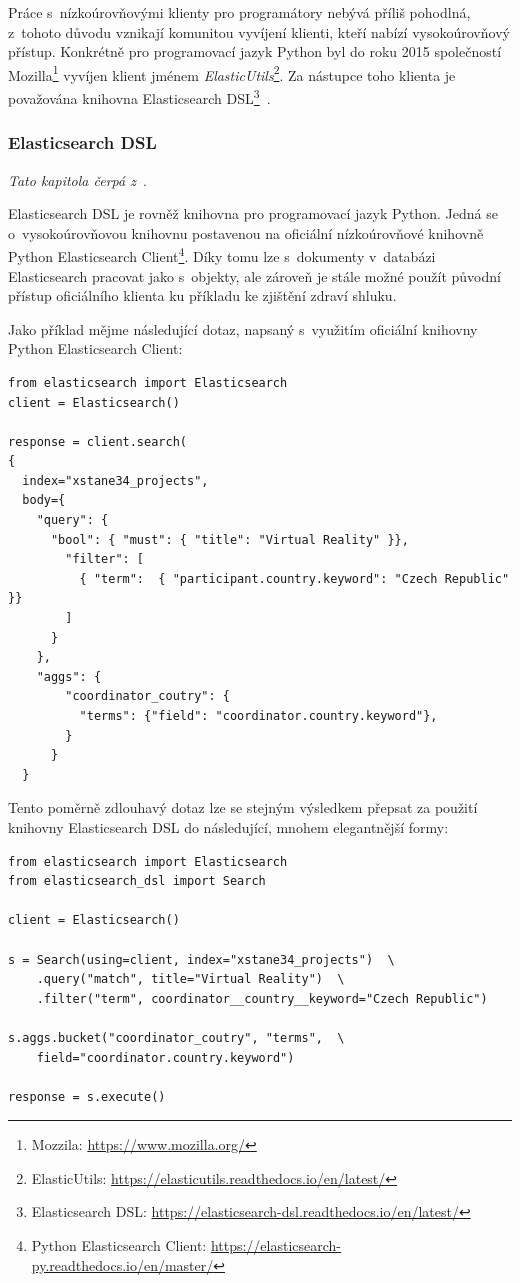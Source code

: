 Práce s~nízkoúrovňovými klienty pro programátory nebývá příliš pohodlná, z~tohoto důvodu vznikají komunitou vyvíjení klienti, kteří nabízí vysokoúrovňový přístup. Konkrétně pro programovací jazyk Python byl do roku 2015 společností Mozilla\footnote{Mozzila: \url{https://www.mozilla.org/}} vyvíjen klient jménem \emph{ElasticUtils}\footnote{ElasticUtils: \url{https://elasticutils.readthedocs.io/en/latest/}}. Za nástupce toho klienta je považována knihovna Elasticsearch DSL\footnote{Elasticsearch DSL: \url{https://elasticsearch-dsl.readthedocs.io/en/latest/}}~\cite{bib:elastic-utils}.

\subsubsection*{Elasticsearch DSL}
\emph{Tato kapitola čerpá z~\cite{bib:elastic-dsl}}.

Elasticsearch DSL je rovněž knihovna pro programovací jazyk Python. Jedná se o~vysokoúrovňovou knihovnu postavenou na oficiální nízkoúrovňové knihovně Python Elasticsearch Client\footnote{Python Elasticsearch Client: \url{https://elasticsearch-py.readthedocs.io/en/master/}}. Díky tomu lze s~dokumenty v~databázi Elasticsearch pracovat jako s~objekty, ale zároveň je stále možné použít původní přístup oficiálního klienta ku příkladu ke zjištění zdraví shluku.

Jako příklad mějme následující dotaz, napsaný s~využitím oficiální knihovny Python Elasticsearch Client:
\begin{verbatim}
from elasticsearch import Elasticsearch
client = Elasticsearch()

response = client.search(
{
  index="xstane34_projects",
  body={
    "query": { 
      "bool": { "must": { "title": "Virtual Reality" }}, 
        "filter": [ 
          { "term":  { "participant.country.keyword": "Czech Republic" }}
        ]
      }
    },
    "aggs": {
        "coordinator_coutry": {
          "terms": {"field": "coordinator.country.keyword"},
        }
      }
  }
\end{verbatim}

Tento poměrně zdlouhavý dotaz lze se stejným výsledkem přepsat za použití knihovny Elasticsearch DSL do následující, mnohem elegantnější formy:

\begin{verbatim}
from elasticsearch import Elasticsearch
from elasticsearch_dsl import Search

client = Elasticsearch()

s = Search(using=client, index="xstane34_projects")  \
    .query("match", title="Virtual Reality")  \
    .filter("term", coordinator__country__keyword="Czech Republic")

s.aggs.bucket("coordinator_coutry", "terms",  \
    field="coordinator.country.keyword")

response = s.execute()
\end{verbatim}

